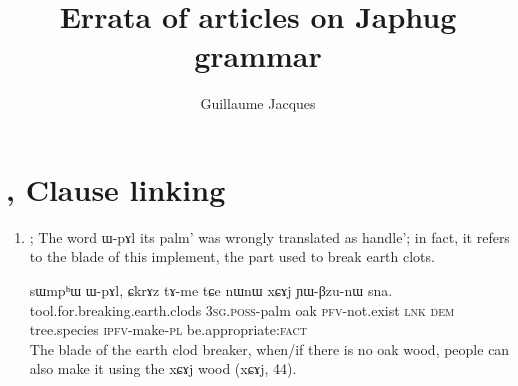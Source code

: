\documentclass[oldfontcommands,oneside,a4paper,11pt]{article}
\newcommand{\ipa}[1]{{\phon \mbox{#1}}} %
\begin{document}
 
\title{Errata of articles on Japhug grammar}
\author{Guillaume Jacques}
\maketitle


\section{\citet{jacques14linking}, Clause linking}
\begin{enumerate}


\item \citet[284, ex. 33]{jacques14linking}; The word \ipa{ɯ-pɤl}  its palm' was wrongly translated as  handle'; in fact, it refers to the blade of this implement, the part used to break earth clots.


\begin{exe}
\ex \label{ex:CkrAz.tAme}
\gll 
   	\ipa{sɯmpʰɯ}  	\ipa{ɯ-pɤl,}  	\ipa{ɕkrɤz}  	\ipa{tɤ-me}  	\ipa{tɕe}  	\ipa{nɯnɯ}  	\ipa{xɕɤj}  	\ipa{ɲɯ-βzu-nɯ}  	\ipa{sna.}  \\
   	tool.for.breaking.earth.clods \textsc{3sg.poss}-palm oak \textsc{pfv}-not.exist \textsc{lnk} \textsc{dem} tree.species \textsc{ipfv}-make-\textsc{pl} be.appropriate:\textsc{fact} \\
\glt The blade of the earth clod breaker, when/if there is no oak wood, people can also make it using the \ipa{xɕɤj} wood (\ipa{xɕɤj}, 44).
\end{exe}
\end{enumerate}




\end{document}
